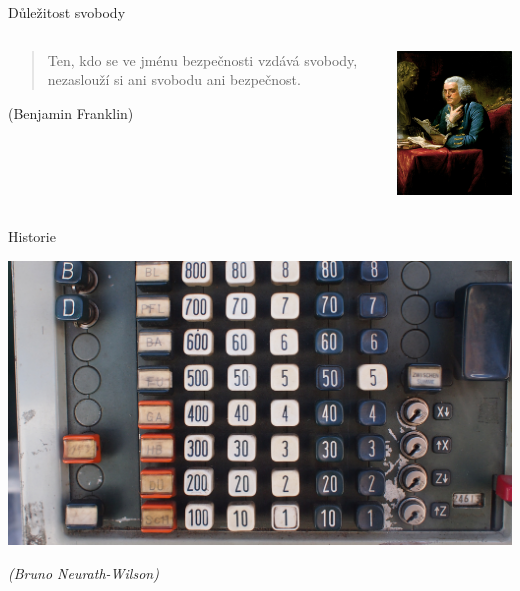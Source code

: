 \documentclass[11pt]{beamer}
\begin{document}
	\begin{frame}{Důležitost svobody}
	\begin{columns}
		\begin{column}{0.5\textwidth}
			\begin{quote}
				Ten, kdo se ve jménu bezpečnosti vzdává svobody, nezaslouží si ani svobodu ani bezpečnost.
			\end{quote}
			\begin{flushright}
				(Benjamin Franklin)
			\end{flushright}
		\end{column}
		\begin{column}{0.5\textwidth}
			\includegraphics[width=5cm]{images/franklin.jpg}
		\end{column}
	\end{columns}
	\end{frame}

	\begin{frame}{Historie}
	\begin{center}
		\includegraphics[width=\textwidth]{images/oldcomp.jpg}
	\end{center}
	\begin{flushright}
		\textit{(Bruno Neurath-Wilson)}
	\end{flushright}
	
	\end{frame}
\end{document}
